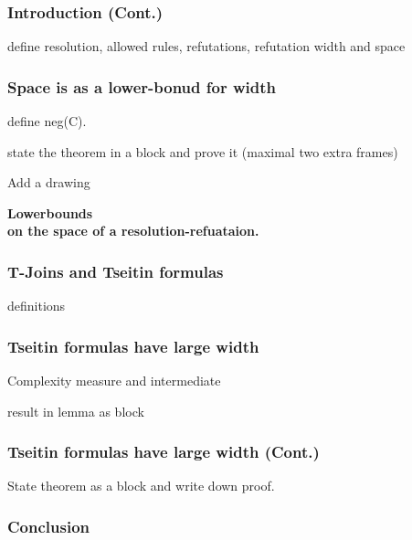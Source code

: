 \documentclass[t,usenames,dvipsnames]{beamer}
\begin{document}
\begin{frame}\frametitle{Introduction (Cont.)}
	define resolution, allowed rules, refutations, refutation width and space 
\end{frame}
\begin{frame}
	\frametitle{Space is as a lower-bonud for width}
	define neg(C).

	state the theorem in a block and prove it (maximal two extra frames)

	Add a drawing
\end{frame}
\begin{frame}[c]
	\color{NavyBlue} \centering \Large \textbf{
	Lowerbounds\\on the space of a resolution-refuataion.}
\end{frame}
\begin{frame} \frametitle{T-Joins and Tseitin formulas}
	definitions
\end{frame}
\begin{frame} \frametitle{Tseitin formulas have large width}
	Complexity measure and intermediate

	result in lemma  as block
\end{frame}
\begin{frame} \frametitle{Tseitin formulas have large width (Cont.)}
	State theorem as a block and write down proof.
\end{frame}
\begin{frame} \frametitle{Conclusion}
	
\end{frame}
\end{document}
